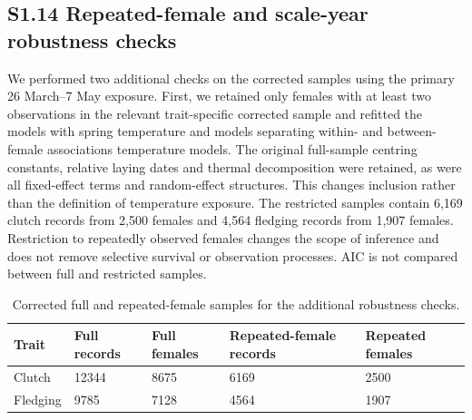 \documentclass{article}
\begin{document}
\subsection{S1.14 Repeated-female and scale-year robustness checks}

We performed two additional checks on the corrected samples using the primary 26 March--7 May exposure. First, we retained only females with at least two observations in the relevant trait-specific corrected sample and refitted the models with spring temperature and models separating within- and between-female associations temperature models. The original full-sample centring constants, relative laying dates and thermal decomposition were retained, as were all fixed-effect terms and random-effect structures. This changes inclusion rather than the definition of temperature exposure. The restricted samples contain 6,169 clutch records from 2,500 females and 4,564 fledging records from 1,907 females. Restriction to repeatedly observed females changes the scope of inference and does not remove selective survival or observation processes. AIC is not compared between full and restricted samples.

\begin{table}[!ht]\centering\scriptsize\singlespacing
\caption{Corrected full and repeated-female samples for the additional robustness checks.}\label{tab:repeat-samples}
\begin{tabular}{lllll}\toprule
Trait & Full records & Full females & Repeated-female records & Repeated females\\\midrule
Clutch & 12344 & 8675 & 6169 & 2500\\
Fledging & 9785 & 7128 & 4564 & 1907\\
\bottomrule\end{tabular}\end{table}
\end{document}
